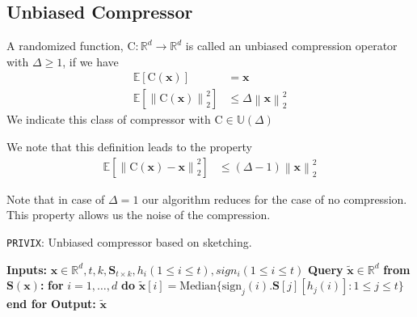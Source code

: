 \subsection{Unbiased Compressor}
\begin{definition}
A randomized function, $\text{C}:\mathbb{R}^{d}\rightarrow\mathbb{R}^{d}$ is called an unbiased compression operator with $\Delta\geq 1$, if we have 
\begin{align}
\mathbb{E}\left[\text{C}(\boldsymbol{x})\right]&=\boldsymbol{x}\nonumber\\
    \mathbb{E}\left[\left\|\text{C}(\boldsymbol{x})\right\|^2_2\right]&\leq \Delta\left\|\boldsymbol{x}\right\|^2_2
\end{align}
We indicate this class of compressor with $\text{C}\in\mathbb{U}(\Delta)$
\end{definition}
We note that this definition leads to the property 
\begin{align}
    \mathbb{E}\left[\left\|\text{C}(\boldsymbol{x})-\boldsymbol{x}\right\|^2_2\right]&\leq \left(\Delta-1\right)\left\|\boldsymbol{x}\right\|^2_2
\end{align}
\begin{remark}
Note that in case of $\Delta=1$ our algorithm reduces for the case of no compression. This property allows us the noise of the compression.
\end{remark}
\begin{algorithm}[H]
\caption{\texttt{PRIVIX}\cite{li2019privacy}: Unbiased compressor based on sketching. }\label{Alg:csketch}
\begin{algorithmic}[1]
\State \textbf{Inputs:} $\boldsymbol{x}\in\mathbb{R}^{d}, t, k, \mathbf{S}_{t\times k}, h_i (1\leq i\leq t), sign_i (1\leq i\leq t)$
\State \textbf{Query} $\tilde{\boldsymbol{x}}\in\mathbb{R}^d$ \textbf{from $\mathbf{S(\boldsymbol{x})}$:}
\State \textbf{for} $i=1,\ldots,d$ \textbf{do}
\State \quad\quad ${\tilde{\boldsymbol{x}}}[i]=\text{Median}\{\text{sign}_j(i).\mathbf{S}[j][h_j(i)]:1\leq j\leq t\}$ 
\State \textbf{end for}
\State \textbf{Output:} ${\tilde{\boldsymbol{x}}}$
\vspace{- 0.1cm}
\end{algorithmic}
\end{algorithm}
